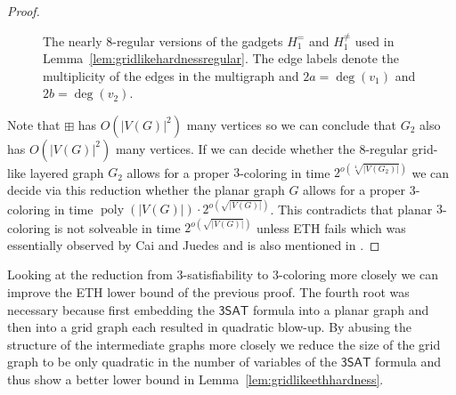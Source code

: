 \documentclass[10pt,a4paper]{article}
\numberwithin{equation}{section}
\theoremstyle{definition}
\newcommand{\SAT}{\ensuremath{\mathsf{3SAT}}}
\DeclareMathOperator{\poly}{poly}
\begin{document}
\begin{proof}
\begin{figure}[tpb]
        \caption{The nearly $8$-regular versions of the gadgets $H^=_1$ and $H^{\neq}_1$ used in Lemma~\ref{lem:gridlikehardnessregular}.
        The edge labels denote the multiplicity of the edges in the multigraph and $2a = \deg(v_1)$ and $2b = \deg(v_2)$.}
        \label{fig:eqgadgetmult}
    \end{figure}

    Note that $\boxplus$ has $O(|V(G)|^2)$ many vertices so we can conclude that $G_2$ also has $O(|V(G)|^2)$ many vertices.
    If we can decide whether the $8$-regular grid-like layered graph $G_2$ allows for a proper $3$-coloring in time $2^{o\left(\sqrt[4]{|V(G_2)|}\right)}$ we can decide via this reduction whether the planar graph $G$ allows for a proper $3$-coloring in time $\poly(|V(G)|) \cdot 2^{o\left(\sqrt{|V(G)|}\right)}$.
    This contradicts that planar $3$-coloring is not solveable in time $2^{o\left(\sqrt{|V(G)|}\right)}$ unless ETH fails which was essentially observed by Cai and Juedes \cite{cai2001subexponential} and is also mentioned in \cite[Theorem 14.9]{cygan2015parameterized}.
\end{proof}

Looking at the reduction from $3$-satisfiability to $3$-coloring more closely we can improve the ETH lower bound of the previous proof.
The fourth root was necessary because first embedding the $\SAT$ formula into a planar graph and then into a grid graph each resulted in quadratic blow-up.
By abusing the structure of the intermediate graphs more closely we reduce the size of the grid graph to be only quadratic in the number of variables of the $\SAT$ formula and thus show a better lower bound in Lemma~\ref{lem:gridlikeethhardness}.
\end{document}
